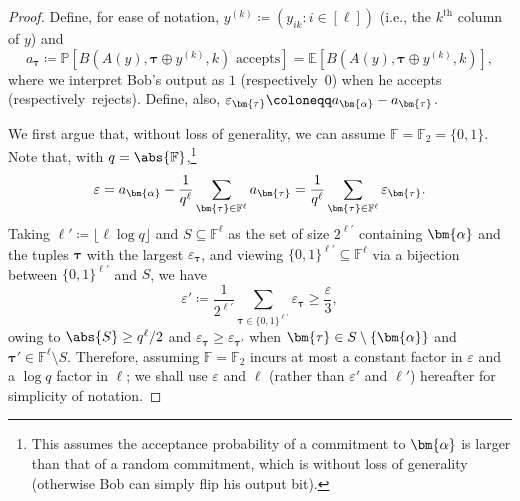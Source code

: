 \documentclass[a4paper,UKenglish,cleveref, autoref, thm-restate]{lipics-v2021}
\theoremstyle{definition}
\newcommand{\E}{\mathbb E}
\newcommand{\field}{\mathbb{F}}
\renewcommand{\P}{\mathbb P}
\renewcommand{\set}[1]{\left\{#1\right\}}
\newcommand{\eps}{\varepsilon}
\newcommand{\bitset}{\{0,1\}}
\newcommand{\pcommitstring}{y}
\newcommand{\fieldsize}{q}
\def\fe#1{
    \ifnum#1=1
        \alpha
    \else
    \ifnum#1=2
        \beta
    \else
    \ifnum#1=3
        \gamma
    \fi\fi\fi
}
\begin{document}
\begin{proof}
    Define, for ease of notation, $\pcommitstring^{(k)} \coloneqq (\pcommitstring_{ik} : i \in [\ell])$ (i.e., the $k^\text{th}$ column of $\pcommitstring$) and
    \begin{equation*}
        a_{\bm{\tau}} \coloneqq \P\left[B\left(A(\pcommitstring), \bm{\tau} \oplus \pcommitstring^{(k)}, k\right) \text{ accepts}\right] = \E\left[B\left(A(\pcommitstring), \bm{\tau} \oplus \pcommitstring^{(k)}, k\right)\right],
    \end{equation*}
    where we interpret Bob's output as $1$ (respectively\ $0$) when he accepts (respectively\ rejects). Define, also, $\eps_{\bm{\tau}} \coloneqq a_{\bm{\fe1}} - a_{\bm{\tau}}$.
    
    We first argue that, without loss of generality, we can assume $\field = \field_2 = \bitset$. Note that, with $\fieldsize = \abs{\field}$,\footnote{This assumes the acceptance probability of a commitment to $\bm{\fe1}$ is larger than that of a random commitment, which is without loss of generality (otherwise Bob can simply flip his output bit).}
    \begin{equation*}
        \eps = a_{\bm{\fe1}} - \frac1{\fieldsize^\ell} \sum_{\bm{\tau} \in \field^\ell} a_{\bm{\tau}} = \frac1{\fieldsize^\ell} \sum_{\bm{\tau} \in \field^\ell} \eps_{\bm{\tau}}.
    \end{equation*}
    Taking $\ell' \coloneqq \lfloor \ell \log \fieldsize \rfloor$ and $S \subseteq \field^\ell$ as the set of size $2^{\ell'}$ containing $\bm{\fe1}$ and the tuples $\bm{\tau}$ with the largest $\eps_{\bm{\tau}}$, and viewing $\bitset^{\ell'} \subseteq \field^\ell$ via a bijection between $\bitset^{\ell'}$ and $S$, we have 
    \begin{equation*}
        \eps' \coloneqq \frac1{2^{\ell'}} \sum_{\bm{\tau} \in \bitset^{\ell'}} \eps_{\bm{\tau}} \geq \frac{\eps}{3},
    \end{equation*}
    owing to $\abs{S} \geq \fieldsize^\ell/2$ and $\eps_{\bm{\tau}} \geq \eps_{\bm{\tau'}}$ when $\bm{\tau} \in S \setminus \set{\bm{\fe1}}$ and $\bm{\tau'} \in \field^\ell \setminus S$. Therefore, assuming $\field = \field_2$ incurs at most a constant factor in $\eps$ and a $\log \fieldsize$ factor in $\ell$; we shall use $\eps$ and $\ell$ (rather than $\eps'$ and $\ell'$) hereafter for simplicity of notation.
    

\end{proof}
\end{document}
